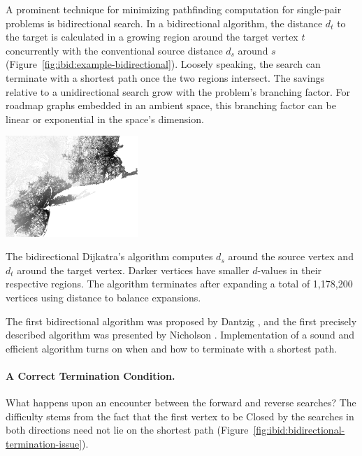 A prominent technique for minimizing pathfinding computation for
single-pair problems
is bidirectional search.
In a bidirectional algorithm,
the distance $d_t$ to the target is calculated in a growing region
around the target vertex $t$
concurrently with the conventional source distance $d_s$ around $s$
(Figure~\ref{fig:ibid:example-bidirectional}).
Loosely speaking,
the search can terminate with a shortest path
once the two regions intersect.
The savings relative to a unidirectional search grow with the problem's
branching factor.
For roadmap graphs embedded in an ambient space,
this branching factor can be linear or exponential in the space's
dimension.
\begin{marginfigure}%
   \centering%
   \includegraphics[width=5cm]{figs/incbi-road-ne/singleshot/example-bidijkstra.png}%
   \caption{The bidirectional Dijkatra's algorithm
      computes $d_s$ around the source vertex
      and $d_t$ around the target vertex.
      Darker vertices have smaller $d$-values in their respective
      regions.
      The algorithm terminates after expanding a total of
      1,178,200 vertices using distance to balance expansions.}%
   \label{fig:ibid:example-bidirectional}%
\end{marginfigure}

The first bidirectional algorithm
was proposed by Dantzig \citep{dantzig1963linearprogramming},
and the first precisely described algorithm was presented by
Nicholson \citep{nicholson1966shortest}.
Implementation of a sound and efficient algorithm
turns on when and how to terminate with a shortest path.

\paragraph{A Correct Termination Condition.}
What happens upon an encounter between the forward and reverse searches?
The difficulty stems from the fact that the first vertex to be
{\sc Closed} by the searches in both directions
need not lie on the shortest path
(Figure~\ref{fig:ibid:bidirectional-termination-issue}).

